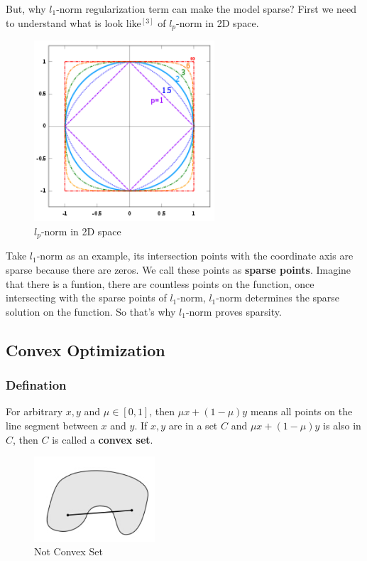 \documentclass[12pt]{ctexart}
\begin{document}
But, why $l_1$-norm regularization term can make the model sparse? First we need to
understand what is look like$^{[3]}$ of $l_p$-norm in 2D space.

\begin{figure}[H]
  \centering
  \includegraphics[width=0.6\textwidth]{assets/2.2 Norm/Lp-Norm in 2D space.png}
  \caption{$l_p$-norm in 2D space}
\end{figure}

Take $l_1$-norm as an example, its intersection points with the coordinate axis are sparse
because there are zeros. We call these points as \textbf{sparse points}. Imagine that there
is a funtion, there are countless points on the function, once intersecting with the sparse
points of $l_1$-norm, $l_1$-norm determines the sparse solution on the function. So that's
why $l_1$-norm proves sparsity.

\subsection{\textbf{Convex Optimization}}

\subsubsection{\textbf{Defination}}

For arbitrary $x, y$ and $\mu \in [0, 1]$, then $\mu x + (1-\mu)y$ means all points
on the line segment between $x$ and $y$. If $x, y$ are in a set $C$ and $\mu x + (1-\mu)y$
is also in $C$, then $C$ is called a \textbf{convex set}.

\begin{figure}[H]
  \centering
  \includegraphics[width=0.4\textwidth]{assets/2.3 Convex Optimization/Not Convex Set.png}
  \caption{Not Convex Set}
\end{figure}
\end{document}
